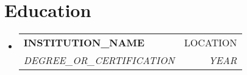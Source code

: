 \documentclass[letterpaper,12pt]{article}
\makeatletter
\newcommand{\resumeSubheading}[4]{
  \vspace{-2pt}\item
    \begin{tabular*}{0.97\textwidth}[t]{l@{\extracolsep{\fill}}r}
      \textbf{#1} & #2 \\
      \textit{\small#3} & \textit{\small #4} \\
    \end{tabular*}\vspace{-7pt}
}
\newcommand{\resumeSubHeadingListStart}{\begin{itemize}[leftmargin=0.15in, label={}]}
\newcommand{\resumeSubHeadingListEnd}{\end{itemize}}
\makeatother
\begin{document}
\section{Education}
  \resumeSubHeadingListStart
    \resumeSubheading
      {INSTITUTION\_NAME}{LOCATION}
      {DEGREE\_OR\_CERTIFICATION}{YEAR}
  \resumeSubHeadingListEnd





\end{document}
